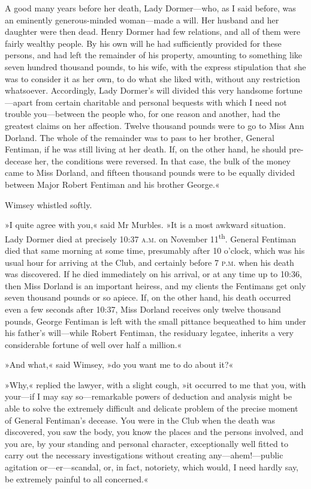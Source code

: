 A good many years before her death, Lady Dormer—who, as I said before, was an eminently generous-minded woman—made a will. Her husband and her daughter were then dead. Henry Dormer had few relations, and all of them were fairly wealthy people. By his own will he had sufficiently provided for these persons, and had left the remainder of his property, amounting to something like seven hundred thousand pounds, to his wife, with the express stipulation that she was to consider it as her own, to do what she liked with, without any restriction whatsoever. Accordingly, Lady Dormer's will divided this very handsome fortune—apart from certain charitable and personal bequests with which I need not trouble you—between the people who, for one reason and another, had the greatest claims on her affection. Twelve thousand pounds were to go to Miss Ann Dorland. The whole of the remainder was to pass to her brother, General Fentiman, if he was still living at her death. If, on the other hand, he should pre-decease her, the conditions were reversed. In that case, the bulk of the money came to Miss Dorland, and fifteen thousand pounds were to be equally divided between Major Robert Fentiman and his brother George.«

Wimsey whistled softly.

»I quite agree with you,« said Mr Murbles. »It is a most awkward situation. Lady Dormer died at precisely 10:37 \textsc{a.m.} on November  11\textsuperscript{th}. General Fentiman died that same morning at some time, presumably after 10 o'clock, which was his usual hour for arriving at the Club, and certainly before 7 \textsc{p.m.} when his death was discovered. If he died immediately on his arrival, or at any time up to 10:36, then Miss Dorland is an important heiress, and my clients the Fentimans get only seven thousand pounds or so apiece. If, on the other hand, his death occurred even a few seconds after 10:37, Miss Dorland receives only twelve thousand pounds, George Fentiman is left with the small pittance bequeathed to him under his father's will—while Robert Fentiman, the residuary legatee, inherits a very considerable fortune of well over half a million.«

»And what,« said Wimsey, »do you want me to do about it?«

»Why,« replied the lawyer, with a slight cough, »it occurred to me that you, with your—if I may say so—remarkable powers of deduction and analysis might be able to solve the extremely difficult and delicate problem of the precise moment of General Fentiman's decease. You were in the Club when the death was discovered, you saw the body, you know the places and the persons involved, and you are, by your standing and personal character, exceptionally well fitted to carry out the necessary investigations without creating any—ahem!—public agitation or—er—scandal, or, in fact, notoriety, which would, I need hardly say, be extremely painful to all concerned.«

